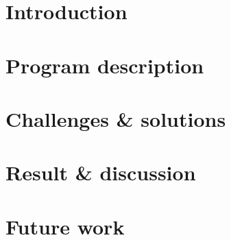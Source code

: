 \documentclass[a4paper,10pt,twoside]{article}
\begin{document}

\tableofcontents
\restoregeometry

\section{Introduction}
\label{sec:introduction}


\section{Program description}
\label{sec:description}


\section{Challenges \& solutions}
\label{sec:challenges}


\section{Result \& discussion}
\label{sec:results}


\section{Future work}
\label{sec:future-work}

\end{document}
